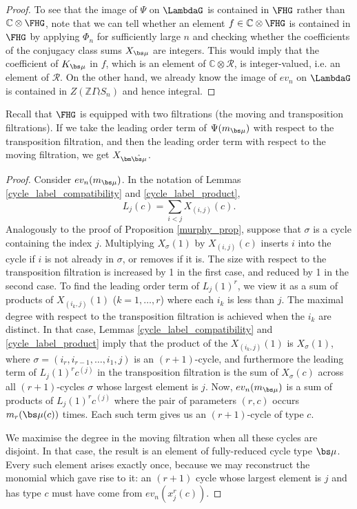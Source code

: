 \begin{proof}
To see that the image of $\Psi$ on $\LambdaG$ is contained in $\FHG$ rather than $\mathbb{C}\otimes \FHG$, note that we can tell whether an element $f \in \mathbb{C} \otimes \FHG$ is contained in $\FHG$ by applying $\Phi_n$ for sufficiently large $n$ and checking whether the coefficients of the conjugacy class sums $X_{\bs\mu}$ are integers. This would imply that the coefficient of $K_{\bs\mu}$ in $f$, which is an element of $\mathbb{C} \otimes \mathcal{R}$, is integer-valued, i.e. an element of $\mathcal{R}$. On the other hand, we already know the image of $ev_n$ on $\LambdaG$ is contained in $Z(\mathbb{Z}\Gamma \wr S_n)$ and hence integral.

\end{proof}


\begin{proposition}
Recall that $\FHG$ is equipped with two filtrations \textup{(}the moving and transposition filtrations\textup{)}. If we take the leading order term of $\Psi(m_{\bs\mu})$ with respect to the transposition filtration, and then the leading order term with respect to the  moving filtration, we get $X_{\bm\hat{\bs\mu}}$.
\end{proposition}

\begin{proof}
Consider $ev_n(m_{\bs\mu})$. In the notation of Lemmas \ref{cycle_label_compatibility} and \ref{cycle_label_product},
\[
L_j(c) = \sum_{i<j} X_{(i,j)}(c).
\]
Analogously to the proof of Proposition \ref{murphy_prop}, suppose that $\sigma$ is a cycle containing the index $j$. Multiplying $X_{\sigma}(1)$ by $X_{(i,j)}(c)$ inserts $i$ into the cycle if $i$ is not already in $\sigma$, or removes if it is. The size with respect to the transposition filtration is increased by 1 in the first case, and reduced by 1 in the second case. To find the leading order term of $L_j(1)^r$, we view it as a sum of products of $X_{(i_k,j)}(1)$ ($k=1,\ldots,r$) where each $i_k$ is less than $j$. The maximal degree with respect to the transposition filtration is achieved when the $i_k$ are distinct. In that case, Lemmas \ref{cycle_label_compatibility} and \ref{cycle_label_product} imply that the product of the $X_{(i_k,j)}(1)$ is $X_{\sigma}(1)$, where $\sigma = (i_r, i_{r-1}, \ldots, i_1, j)$ is an $(r+1)$-cycle, and furthermore the leading term of $L_j(1)^r c^{(j)}$ in the transposition filtration is the sum of $X_{\sigma}(c)$ across all $(r+1)$-cycles $\sigma$ whose largest element is $j$. Now, $ev_n(m_{\bs\mu})$ is a sum of products of $L_j(1)^r c^{(j)}$ where the pair of parameters $(r, c)$ occurs $m_r(\bs\mu(c))$ times. Each such term gives us an $(r+1)$-cycle of type $c$.

We maximise the degree in the moving filtration when all these cycles are disjoint. In that case, the result is an element of fully-reduced cycle type $\bs\mu$. Every such element arises exactly once, because we may reconstruct the monomial which gave rise to it: an $(r+1)$ cycle whose largest element is $j$ and has type $c$ must have come from $ev_n(x_j^r(c))$.
\end{proof}


